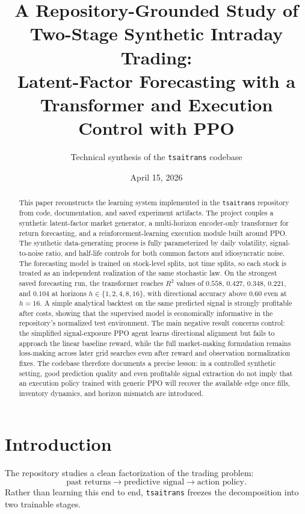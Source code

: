 \documentclass[11pt]{article}
\title{\textbf{A Repository-Grounded Study of Two-Stage Synthetic Intraday Trading:}\\
Latent-Factor Forecasting with a Transformer and Execution Control with PPO}
\author{Technical synthesis of the \texttt{tsaitrans} codebase}
\date{April 15, 2026}
\begin{document}
\maketitle

\begin{abstract}
This paper reconstructs the learning system implemented in the \texttt{tsaitrans} repository from code, documentation, and saved experiment artifacts. The project couples a synthetic latent-factor market generator, a multi-horizon encoder-only transformer for return forecasting, and a reinforcement-learning execution module built around PPO. The synthetic data-generating process is fully parameterized by daily volatility, signal-to-noise ratio, and half-life controls for both common factors and idiosyncratic noise. The forecasting model is trained on stock-level splits, not time splits, so each stock is treated as an independent realization of the same stochastic law. On the strongest saved forecasting run, the transformer reaches \(R^2\) values of \(0.558\), \(0.427\), \(0.348\), \(0.221\), and \(0.104\) at horizons \(h \in \{1,2,4,8,16\}\), with directional accuracy above \(0.60\) even at \(h=16\). A simple analytical backtest on the same predicted signal is strongly profitable after costs, showing that the supervised model is economically informative in the repository's normalized test environment. The main negative result concerns control: the simplified signal-exposure PPO agent learns directional alignment but fails to approach the linear baseline reward, while the full market-making formulation remains loss-making across later grid searches even after reward and observation normalization fixes. The codebase therefore documents a precise lesson: in a controlled synthetic setting, good prediction quality and even profitable signal extraction do not imply that an execution policy trained with generic PPO will recover the available edge once fills, inventory dynamics, and horizon mismatch are introduced.
\end{abstract}

\section{Introduction}
The repository studies a clean factorization of the trading problem:
\[
\text{past returns} \rightarrow \text{predictive signal} \rightarrow \text{action policy}.
\]
Rather than learning this end to end, \texttt{tsaitrans} freezes the decomposition into two trainable stages.
\end{document}
